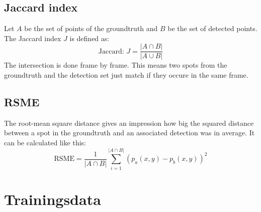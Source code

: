 \subsection{Jaccard index}
Let $A$ be the set of points of the groundtruth and $B$ be the set of detected points. The Jaccard index $J$ is defined as:
\begin{equation}
\text{Jaccard: }J = \frac{\left|A\cap B\right|}{\left|A\cup B\right|}
\end{equation}
The intersection is done frame by frame. This means two spots from the groundtruth and the detection set just match if they occure in the same frame. 
\subsection{RSME}
The root-mean square distance gives an impression how big the squared distance between a spot in the groundtruth and an associated detection was in average. It can be calculated like this:
\begin{equation}
\text{RSME} = \frac{1}{\left|A\cap B\right|}\sum\limits_{i=1}^{\left|A\cap B\right|} \left(p_a(x,y)-p_b(x,y)\right)^2
\end{equation}
\section{Trainingsdata}
